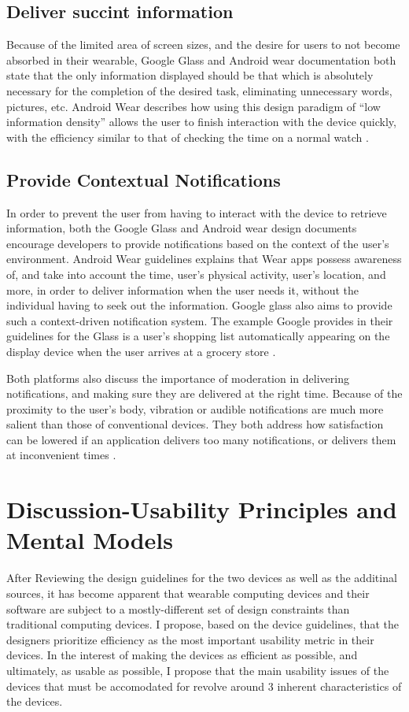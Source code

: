 \documentclass[12pt]{article}
\begin{document}
\subsection{Deliver succint information}
Because of the limited area of screen sizes, and the desire for users to not become absorbed in their wearable, Google Glass and Android wear documentation both state that the only information displayed should be that which is absolutely necessary for the completion of the desired task, eliminating unnecessary words, pictures, etc. Android Wear describes how using this design paradigm of ``low information density'' allows the user to finish interaction with the device quickly, with the efficiency similar to that of checking the time on a normal watch \cite{andr3}. 

\subsection{Provide Contextual Notifications}
In order to prevent the user from having to interact with the device to retrieve information, both the Google Glass and Android wear design documents encourage developers to provide notifications based on the context of the user's environment. Android Wear guidelines explains that Wear apps possess awareness of, and take into account the time, user's physical activity, user's location, and more, in order to deliver information when the user needs it, without the individual having to seek out the information\cite{andr2}. Google glass also aims to provide such a context-driven notification system. The example Google provides in their guidelines for the Glass is a user's shopping list automatically appearing on the display device when the user arrives at a grocery store \cite{goog}.

Both platforms also discuss the importance of moderation in delivering notifications, and making sure they are delivered at the right time. Because of the proximity to the user's body, vibration or audible notifications are much more salient than those of conventional devices. They both address how satisfaction can be lowered if an application delivers too many notifications, or delivers them at inconvenient times \cite{goog} \cite{andr}.

\section{Discussion-Usability Principles and Mental Models}
After Reviewing the design guidelines for the two devices as well as the additinal sources, it has become apparent that wearable computing devices and their software are subject to a mostly-different set of design constraints than traditional computing devices. I  propose, based on the device guidelines, that the designers prioritize efficiency as the most important usability metric in their devices. In the interest of making the devices as efficient as possible, and ultimately, as usable as possible, I propose that the main usability issues of the devices that must be accomodated for revolve around 3 inherent characteristics of the devices.
\end{document}
